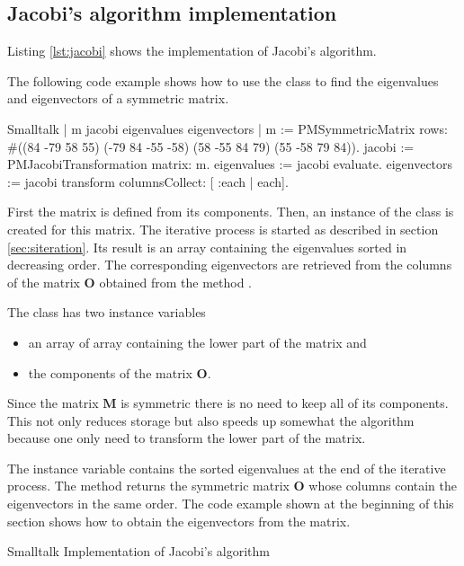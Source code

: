 \subsection{Jacobi's algorithm implementation}
Listing \ref{lst:jacobi} shows the implementation of Jacobi's algorithm.

The following code example shows how to use the class to find the
eigenvalues and eigenvectors of a symmetric matrix.
\begin{displaycode}{Smalltalk}
 | m jacobi eigenvalues eigenvectors |
 m := PMSymmetricMatrix rows: #((84 -79 58 55)
                                 (-79 84 -55 -58)
                                 (58 -55 84 79)
                                 (55 -58 79 84)).
 jacobi := PMJacobiTransformation matrix: m.
 eigenvalues := jacobi evaluate.
 eigenvectors := jacobi transform columnsCollect: [ :each | each].
\end{displaycode}
First the matrix  is defined from its components. Then, an
instance of the class  is created for
this matrix. The iterative process is started as described in
section \ref{sec:siteration}. Its result is an array containing
the eigenvalues sorted in decreasing order. The corresponding
eigenvectors are retrieved from the columns of the matrix $\textbf{O}$ obtained from the method .

The class  has two instance variables
\begin{itemize}
  \item {} an array of array containing the lower part
  of the matrix and
  \item {} the components of the matrix $\textbf{O}$.
\end{itemize}
Since the matrix $\textbf{M}$ is symmetric there is no need to keep
all of its components. This not only reduces storage but also
speeds up somewhat the algorithm because one only need to
transform the lower part of the matrix.

The instance variable  contains the sorted eigenvalues
at the end of the iterative process. The method 
returns the symmetric matrix ${\textbf{O}}$ whose columns contain the
eigenvectors in the same order. The code example shown at the
beginning of this section shows how to obtain the eigenvectors
from the matrix.

\begin{listing}[label=lst:jacobi]{Smalltalk}
{Implementation of Jacobi's algorithm }
%
\end{listing}

